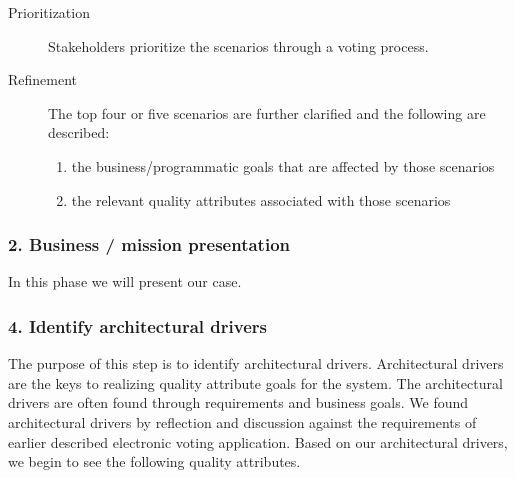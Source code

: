 \begin{description}
    \item [Prioritization] 
  Stakeholders prioritize the scenarios through a voting process. 
    
    \item [Refinement]
        The top four or five scenarios are further clarified and the following are described:
        \begin{enumerate}
            \item the business/programmatic goals that are affected by those scenarios
            \item the relevant quality attributes associated with those scenarios   
        \end{enumerate}

   

\end{description}




\subsubsection{2. Business / mission presentation}
In this phase we will present our case.
 

\subsubsection{4. Identify architectural drivers}
The purpose of this step is to identify architectural drivers. Architectural drivers are the keys to realizing quality attribute goals for the system. The architectural drivers are often found through requirements and business goals. We found architectural drivers by reflection and discussion against the requirements of earlier described electronic voting application. Based on our architectural drivers, we begin to see the following quality attributes.\\


